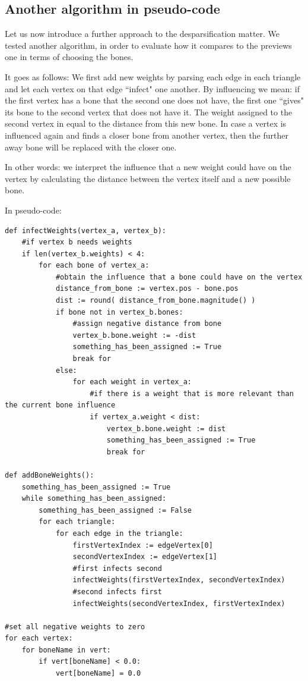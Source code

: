 \documentclass[12pt,twoside]{report}
\begin{document}
\subsection{Another algorithm in pseudo-code}
\label{sec:infection}
Let us now introduce a further approach to the desparsification matter. We tested another algorithm, in order to evaluate how it compares to the previews one in terms of choosing the bones.

It goes as follows: We first add new weights by parsing each edge in each triangle and let each vertex on that edge ``infect" one another. By influencing we mean: if the first vertex has a bone that the second one does not have, the first one ``gives" its bone to the second vertex that does not have it. The weight assigned to the second vertex in equal to the distance from this new bone. In case a vertex is influenced again and finds a closer bone from another vertex, then the further away bone will be replaced with the closer one.

In other words: we interpret the influence that a new weight could have on the vertex by calculating the distance between the vertex itself and a new possible bone.

In pseudo-code:

\begin{lstlisting}
def infectWeights(vertex_a, vertex_b):
    #if vertex b needs weights
    if len(vertex_b.weights) < 4:
    	for each bone of vertex_a:
    		#obtain the influence that a bone could have on the vertex
    		distance_from_bone := vertex.pos - bone.pos
    		dist := round( distance_from_bone.magnitude() )
    		if bone not in vertex_b.bones:
    			#assign negative distance from bone
    			vertex_b.bone.weight := -dist
    			something_has_been_assigned := True
    			break for
    		else:
    			for each weight in vertex_a:
    				#if there is a weight that is more relevant than the current bone influence
    				if vertex_a.weight < dist:
    					vertex_b.bone.weight := dist
    					something_has_been_assigned := True
    					break for

def addBoneWeights():
	something_has_been_assigned := True
	while something_has_been_assigned:
		something_has_been_assigned := False
		for each triangle:
			for each edge in the triangle:
				firstVertexIndex := edgeVertex[0]
				secondVertexIndex := edgeVertex[1]
				#first infects second
				infectWeights(firstVertexIndex, secondVertexIndex)
                #second infects first
    	    	infectWeights(secondVertexIndex, firstVertexIndex)

#set all negative weights to zero
for each vertex:
	for boneName in vert:
		if vert[boneName] < 0.0:
			vert[boneName] = 0.0
\end{lstlisting}
\end{document}
